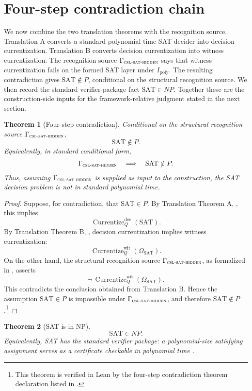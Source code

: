 \documentclass[11pt]{article}
\newcommand{\Ipoly}{I_{\mathrm{poly}}}
\newcommand{\OmegaSAT}{\Omega_{\mathrm{SAT}}}
\newcommand{\CurrentizeDec}{\operatorname{Currentize}^{\mathrm{dec}}_{Q}}
\newcommand{\CurrentizeWit}{\operatorname{Currentize}^{\mathrm{wit}}_{Q}}
\newcommand{\CSLSATHidden}{\Gamma_{\textsc{csl-sat-hidden}}}
\newtheorem{theorem}{Theorem}[section]
\theoremstyle{definition}
\begin{document}
\section{Four-step contradiction chain}
\label{sec:contradiction-chain}

We now combine the two translation theorems with the recognition
source.  Translation A converts a standard polynomial-time SAT decider
into decision currentization.  Translation B converts decision
currentization into witness currentization.  The recognition source
\(\CSLSATHidden\) says that witness currentization fails on the
formed SAT layer under \(\Ipoly\).  The resulting contradiction gives
\(\mathrm{SAT}\notin P\), conditional on the structural recognition
source.  We then record the standard verifier-package fact
\(\mathrm{SAT}\in NP\).  Together these are the construction-side
inputs for the framework-relative judgment stated in the next section.

\begin{theorem}[Four-step contradiction]
\label{thm:four-step-contradiction-conditional}
Conditional on the structural recognition source \(\CSLSATHidden\),
\[
  \mathrm{SAT}\notin P.
\]
Equivalently, in standard conditional form,
\[
  \CSLSATHidden
  \quad\Longrightarrow\quad
  \mathrm{SAT}\notin P.
\]
Thus, assuming \(\CSLSATHidden\) is supplied as input to the
construction, the SAT decision problem is not in standard polynomial
time.
\end{theorem}

\begin{proof}
Suppose, for contradiction, that \(\mathrm{SAT}\in P\).  By
Translation Theorem A, , this implies
\[
  \CurrentizeDec(\mathrm{SAT}).
\]
By Translation Theorem B, , decision
currentization implies witness currentization:
\[
  \CurrentizeWit(\OmegaSAT).
\]
On the other hand, the structural recognition source
\(\CSLSATHidden\), as formalized in
, asserts
\[
  \neg\,\CurrentizeWit(\OmegaSAT).
\]
This contradicts the conclusion obtained from Translation B.  Hence
the assumption \(\mathrm{SAT}\in P\) is impossible under
\(\CSLSATHidden\), and therefore \(\mathrm{SAT}\notin P\).\footnote{This
theorem is verified in Lean by the four-step contradiction theorem
declaration listed in .}
\end{proof}

\begin{theorem}[SAT is in NP]
\label{thm:pvnp:sat-in-np}
\[
  \mathrm{SAT}\in NP.
\]
Equivalently, SAT has the standard verifier package: a polynomial-size
satisfying assignment serves as a certificate checkable in polynomial
time \citep{Cook1971TheoremProving,AroraBarak2009Complexity}.
\end{theorem}
\end{document}
